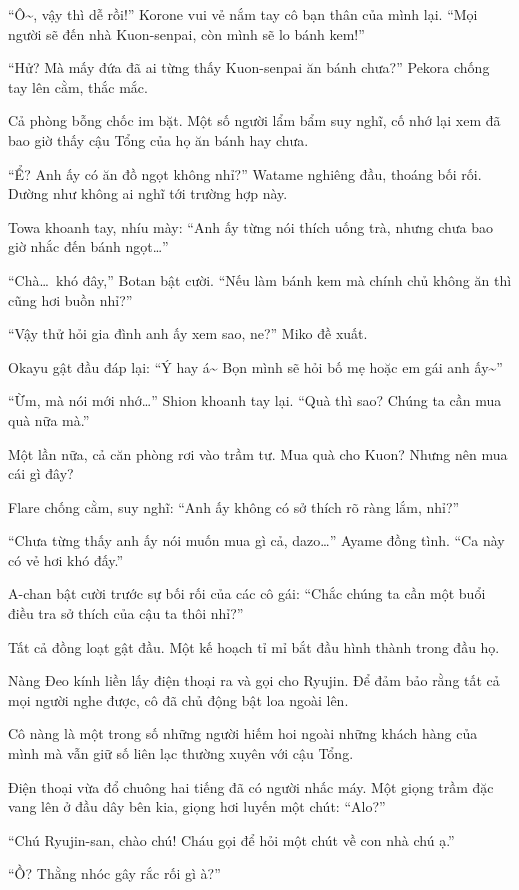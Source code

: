 \documentclass[../main.tex]{subfiles}
\begin{document}
``Ô\~{}, vậy thì dễ rồi!'' Korone vui vẻ nắm tay cô bạn thân của mình lại. ``Mọi người sẽ đến nhà Kuon-senpai, còn mình sẽ lo bánh kem!''

``Hử? Mà mấy đứa đã ai từng thấy Kuon-senpai ăn bánh chưa?'' Pekora chống tay lên cằm, thắc mắc.

Cả phòng bỗng chốc im bặt. Một số người lẩm bẩm suy nghĩ, cố nhớ lại xem đã bao giờ thấy cậu Tổng của họ ăn bánh hay chưa.

``Ể? Anh ấy có ăn đồ ngọt không nhỉ?'' Watame nghiêng đầu, thoáng bối rối. Dường như không ai nghĩ tới trường hợp này.

Towa khoanh tay, nhíu mày: ``Anh ấy từng nói thích uống trà, nhưng chưa bao giờ nhắc đến bánh ngọt\dots''

``Chà\dots\ khó đây,'' Botan bật cười. ``Nếu làm bánh kem mà chính chủ không ăn thì cũng hơi buồn nhỉ?''

``Vậy thử hỏi gia đình anh ấy xem sao, ne?'' Miko đề xuất.

Okayu gật đầu đáp lại: ``Ý hay á\~{} Bọn mình sẽ hỏi bố mẹ hoặc em gái anh ấy\~{}''

``Ừm, mà nói mới nhớ\dots'' Shion khoanh tay lại. ``Quà thì sao? Chúng ta cần mua quà nữa mà.''

Một lần nữa, cả căn phòng rơi vào trầm tư. Mua quà cho Kuon? Nhưng nên mua cái gì đây?

Flare chống cằm, suy nghĩ: ``Anh ấy không có sở thích rõ ràng lắm, nhỉ?''

``Chưa từng thấy anh ấy nói muốn mua gì cả, dazo\dots'' Ayame đồng tình. ``Ca này có vẻ hơi khó đấy.''

A-chan bật cười trước sự bối rối của các cô gái: ``Chắc chúng ta cần một buổi điều tra sở thích của cậu ta thôi nhỉ?''

Tất cả đồng loạt gật đầu. Một kế hoạch tỉ mỉ bắt đầu hình thành trong đầu họ.

Nàng Đeo kính liền lấy điện thoại ra và gọi cho Ryujin. Để đảm bảo rằng tất cả mọi người nghe được, cô đã chủ động bật loa ngoài lên.

Cô nàng là một trong số những người hiếm hoi ngoài những khách hàng của mình mà vẫn giữ số liên lạc thường xuyên với cậu Tổng.

Điện thoại vừa đổ chuông hai tiếng đã có người nhấc máy. Một giọng trầm đặc vang lên ở đầu dây bên kia, giọng hơi luyến một chút: ``Alo?''

``Chú Ryujin-san, chào chú! Cháu gọi để hỏi một chút về con nhà chú ạ.''

``Ồ? Thằng nhóc gây rắc rối gì à?''
\end{document}
